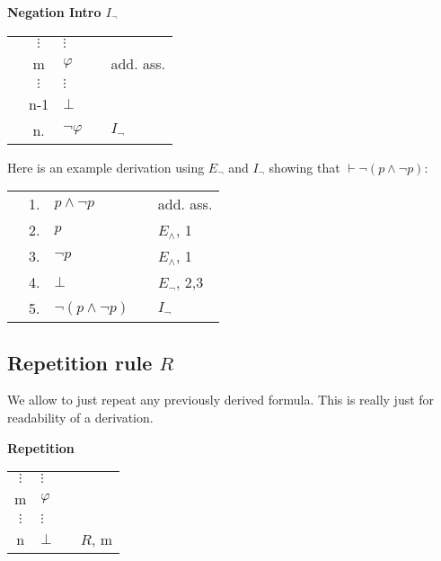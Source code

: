 \documentclass[nobib,nofonts]{tufte-handout}
\begin{document}
\bigskip
\noindent \colorbox{mygray!60}{\centering
  \begin{minipage}[t]{0.35\linewidth}
    \textbf{Negation Intro $I_{\neg}$}
  \end{minipage}
  \begin{minipage}[t]{0.55\linewidth}
    \begin{tabular}{cclcl}
                         &                   $\vdots$ & $\vdots$       & \\
      \cline{1-2} \vline & m                          & $\varphi$      & & add. ass.  \\
      \vline             &                   $\vdots$ & $\vdots$       & \\
      \vline             & n-1                        & $\bot$         & & \\ \hline
                         & n.                         & $\neg \varphi$ & & $I_{\neg}$
    \end{tabular}
  \end{minipage}
}
\bigskip

Here is an example derivation using $E_{\neg}$ and $I_{\neg}$ showing that $\vdash \neg(p \wedge \neg p)$:

\bigskip

\begin{tabular}{cclcl}
  \cline{1-2} \vline & 1. & $p \wedge \neg p$       & & add. ass. \\
  \vline             & 2. & $p$                     & & $E_{\wedge}$, 1  \\
  \vline             & 3. & $\neg p$                & & $E_{\wedge}$, 1  \\
  \vline             & 4. & $\bot$                  & & $E_{\neg}$, 2,3  \\ \hline
                     & 5. & $\neg(p \wedge \neg p)$ & & $I_{\neg}$   \\
\end{tabular}


\subsection{Repetition rule $R$}

We allow to just repeat any previously derived formula.
This is really just for readability of a derivation.

\bigskip
\noindent \colorbox{mygray!60}{\centering
  \begin{minipage}[t]{0.35\linewidth}
    \textbf{Repetition}
  \end{minipage}
  \begin{minipage}[t]{0.55\linewidth}
    \begin{tabular}{clcl}
            $\vdots$ & $\vdots$  & \\
      m              & $\varphi$ &  \\
            $\vdots$ & $\vdots$  & \\
      n              & $\bot$    & & $R$, m
    \end{tabular}
  \end{minipage}
}
\bigskip
\end{document}
